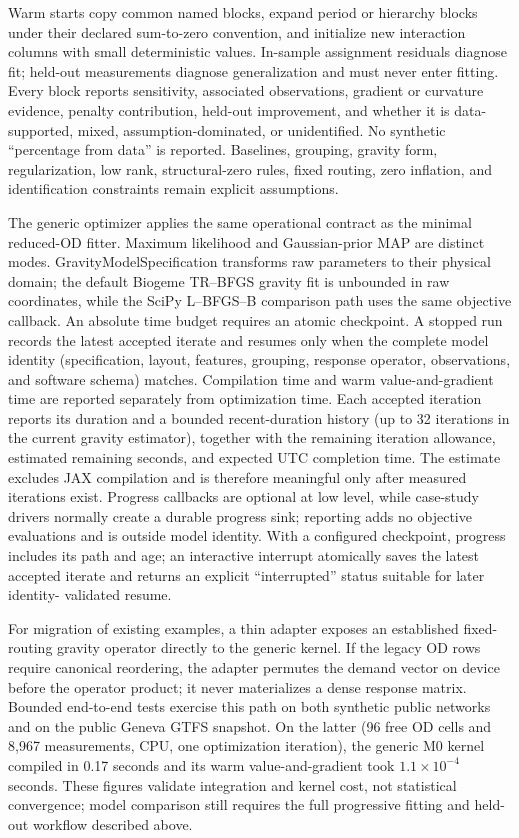 Warm starts copy common named blocks, expand period or hierarchy blocks under
their declared sum-to-zero convention, and initialize new interaction columns
with small deterministic values.  In-sample assignment residuals diagnose fit;
held-out measurements diagnose generalization and must never enter fitting.
Every block reports sensitivity, associated observations, gradient or
curvature evidence, penalty contribution, held-out improvement, and whether it
is data-supported, mixed, assumption-dominated, or unidentified.  No synthetic
``percentage from data'' is reported.  Baselines, grouping, gravity form,
regularization, low rank, structural-zero rules, fixed routing, zero inflation,
and identification constraints remain explicit assumptions.

The generic optimizer applies the same operational contract as the minimal
reduced-OD fitter.  Maximum likelihood and Gaussian-prior MAP are distinct
modes.  GravityModelSpecification transforms raw parameters to their physical
domain; the default Biogeme TR--BFGS gravity fit is unbounded in raw
coordinates, while the SciPy L--BFGS--B comparison path uses the same
objective callback.  An absolute time
budget requires an atomic checkpoint.  A stopped run records the latest
accepted iterate and resumes only when the complete model identity
(specification, layout, features, grouping, response operator, observations,
and software schema) matches.  Compilation time and warm value-and-gradient
time are reported separately from optimization time.
Each accepted iteration reports its duration and a bounded recent-duration
history (up to 32 iterations in the current gravity estimator), together with
the remaining iteration allowance, estimated remaining seconds, and expected
UTC completion time.  The estimate excludes JAX compilation and is therefore
meaningful only after measured iterations exist.  Progress callbacks are
optional at low level, while case-study drivers normally create a durable
progress sink; reporting adds no objective evaluations and is outside model
identity.  With a configured checkpoint, progress includes its path and age;
an interactive interrupt atomically saves the latest accepted iterate and
returns an explicit ``interrupted'' status suitable for later identity-
validated resume.

For migration of existing examples, a thin adapter exposes an established
fixed-routing gravity operator directly to the generic kernel.  If the legacy
OD rows require canonical reordering, the adapter permutes the demand vector on
device before the operator product; it never materializes a dense response
matrix.  Bounded end-to-end tests exercise this path on both synthetic public
networks and on the public Geneva GTFS snapshot.  On the latter (96 free OD
cells and 8,967 measurements, CPU, one optimization iteration), the generic M0
kernel compiled in 0.17 seconds and its warm value-and-gradient took
$1.1\times10^{-4}$ seconds.  These figures validate integration and kernel
cost, not statistical convergence; model comparison still requires the full
progressive fitting and held-out workflow described above.
